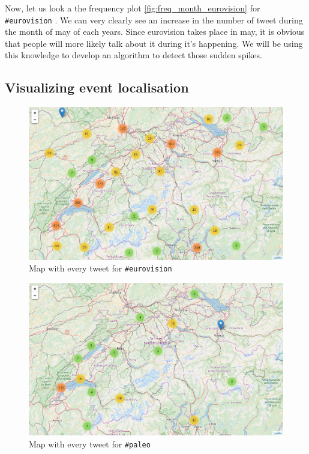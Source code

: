 \documentclass[11pt]{article}
\begin{document}
Now, let us look a the frequency plot \ref{fig:freq_month_eurovision} for \texttt{\#eurovision} .
We can very clearly see an increase in the number of tweet during the month of may of each years. Since eurovision takes place in may, it is obvious that people will more likely talk about it during it's happening. We will be using this knowledge to develop an algorithm to detect those sudden spikes.

\subsection{Visualizing event localisation}

\begin{figure}[htbp]
  \vspace*{-1mm}
  \centering
  \includegraphics[width=\columnwidth]{figures/map_eurovision.png}
  \vspace{-5mm}
  \caption{Map with every tweet for \texttt{\#eurovision}}
  \label{fig:map_eurovision}
\end{figure}

\begin{figure}[htbp]
  \vspace*{-1mm}
  \centering
  \includegraphics[width=\columnwidth]{figures/map_paleo.png}
  \vspace{-5mm}
  \caption{Map with every tweet for \texttt{\#paleo}}
  \label{fig:map_paleo}
\end{figure}
\end{document}
